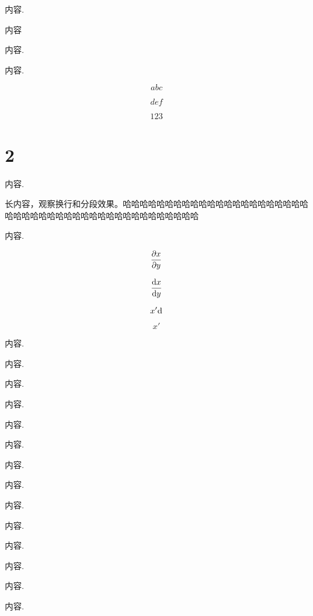\documentclass[zihao=-4, fontset=windows]{MyBeautybook-CN}
\begin{document}
    \begin{example}
        内容.

        内容
    \end{example}

    \begin{conclusion}
        内容.
    \end{conclusion}

    \begin{conclusion}
        内容.
    \end{conclusion}

    \begin{property}
        \begin{equation}
            abc
        \end{equation}
    \end{property}

    \begin{property}
        \begin{equation}
            def
        \end{equation}
    \end{property}

    \begin{property}
        \begin{equation}
            123
        \end{equation}
    \end{property}

    \section{2}

    \begin{note}
        内容.

        \indent 长内容，观察换行和分段效果。哈哈哈哈哈哈哈哈哈哈哈哈哈哈哈哈哈哈哈哈哈哈哈哈哈哈哈哈哈哈哈哈哈哈哈哈哈哈哈哈哈哈哈哈哈 \cite{Huybrechts2010Complex}
    \end{note}

    \begin{axiom}
        内容.

        $$
        \Diff[x]{y}
        $$

        $$
        \Dif{x}{y}
        $$

        $$
        x\pr \dd
        $$

        $$
        x'
        $$

        内容.

        内容.

        内容.

        内容.

        内容.

        内容.

        内容.

        内容.

        内容.

        内容.

        内容.

        内容.

        内容.

        内容.
    \end{axiom}
\end{document}
